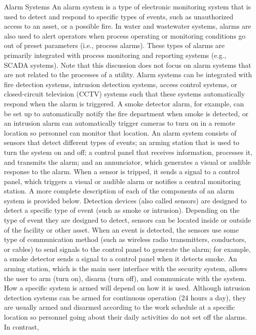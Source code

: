 \documentclass{article}
\begin{document}
Alarm Systems An alarm system is a type of electronic monitoring system
that is used to detect and respond to specific types of events, such as
unauthorized access to an asset, or a possible fire. In water and
wastewater systems, alarms are also used to alert operators when process
operating or monitoring conditions go out of preset parameters (i.e.,
process alarms). These types of alarms are primarily integrated with
process monitoring and reporting systems (e.g., SCADA systems). Note
that this discussion does not focus on alarm systems that are not
related to the processes of a utility. Alarm systems can be integrated
with fire detection systems, intrusion detection systems, access control
systems, or closed-circuit television (CCTV) systems such that these
systems automatically respond when the alarm is triggered. A smoke
detector alarm, for example, can be set up to automatically notify the
fire department when smoke is detected, or an intrusion alarm can
automatically trigger cameras to turn on in a remote location so
personnel can monitor that location. An alarm system consists of sensors
that detect different types of events; an arming station that is used to
turn the system on and off; a control panel that receives information,
processes it, and transmits the alarm; and an annunciator, which
generates a visual or audible response to the alarm. When a sensor is
tripped, it sends a signal to a control panel, which triggers a visual
or audible alarm or notifies a central monitoring station. A more
complete description of each of the components of an alarm system is
provided below. Detection devices (also called sensors) are designed to
detect a specific type of event (such as smoke or intrusion). Depending
on the type of event they are designed to detect, sensors can be located
inside or outside of the facility or other asset. When an event is
detected, the sensors use some type of communication method (such as
wireless radio transmitters, conductors, or cables) to send signals to
the control panel to generate the alarm; for example, a smoke detector
sends a signal to a control panel when it detects smoke. An arming
station, which is the main user interface with the security system,
allows the user to arm (turn on), disarm (turn off), and communicate
with the system. How a specific system is armed will depend on how it is
used. Although intrusion detection systems can be armed for continuous
operation (24 hours a day), they are usually armed and disarmed
according to the work schedule at a specific location so personnel going
about their daily activities do not set off the alarms. In contrast,
\end{document}
